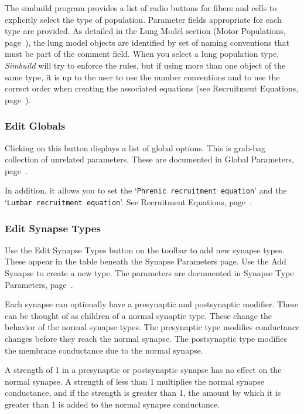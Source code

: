 \documentclass[12pt,openany,oneside]{book}
\newcommand{\tisamp}[1]{`\texttt{#1}'}
\newcommand{\tiref}[1]{#1, page~\pageref{#1}}
\newcommand{\prog}[1]{\textit{{#1}}}
\begin{document}
The simbuild program provides a list of radio buttons for fibers and cells
to explicitly select the type of population. Parameter fields appropriate
for each type are provided. As detailed in the Lung Model section
(\tiref{Motor Populations}), the lung model objects are identified by set
of naming conventions that must be part of the comment field. When you
select a lung population type, \prog{Simbuild} will try to enforce the
rules, but if using more than one object of the same type, it is up to the
user to use the number conventions and to use the correct order when
creating the associated equations (see \tiref{Recruitment Equations}).


\subsubsection{Edit Globals}
Clicking on this button displays a list of global options. This is 
grab-bag collection of unrelated parameters. These are documented in
\tiref{Global Parameters}.

In addition, it allows you to set the \tisamp{Phrenic recruitment equation}
and the \tisamp{Lumbar recruitment equation}. See \tiref{Recruitment Equations}.

\subsubsection{Edit Synapse Types}

Use the Edit Synapse Types button on the toolbar to add new synapse types.
These appear in the table beneath the Synapse Parameters page. Use the
Add Synapse to create a new type. The parameters are documented in
\tiref{Synapse Type Parameters}.

Each synapse can optionally have a presynaptic and postsynaptic
modifier. These can be thought of as children of a normal synaptic type.
These change the behavior of the normal synapse types. The presynaptic
type modifies conductance changes before they reach the normal synapse.
The postsynaptic type modifies the membrane conductance due to the normal
synapse.

A strength of 1 in a presynaptic or postsynaptic synapse has no effect
on the normal synapse. A strength of less than 1 multiplies the normal
synapse conductance, and if the strength is greater than 1, the amount by
which it is greater than 1 is added to the normal synapse conductance.
\end{document}
